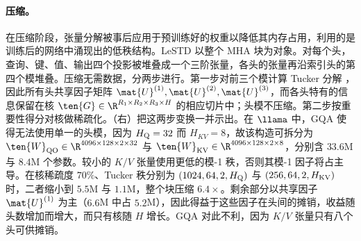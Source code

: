 \paragraph{压缩。}
在压缩阶段，张量分解被事后应用于预训练好的权重以降低其内存占用，利用的是训练后的网络中涌现出的低秩结构。LeSTD \cite{li2026lestd} 以整个 MHA 块为对象。对每个头，查询、键、值、输出四个投影被堆叠成一个三阶张量，各头的张量再沿索引头的第四个模堆叠。压缩无需数据，分两步进行。第一步对前三个模计算 Tucker 分解
，因此所有头共享因子矩阵 $\mat{U}^{(1)},\mat{U}^{(2)},\mat{U}^{(3)}$，而各头特有的信息保留在核 $\ten{G}\in\R^{R_1\times R_2\times R_3\times H}$ 的相应切片中；头模不压缩。第二步按重要性得分对核做稀疏化。（右）把这两步变换一并示出。在 $\llama$ 中，GQA 使得无法使用单一的头模，因为 $H_{\rm Q}=32$ 而 $H_{KV}=8$，故该构造可拆分为 $\ten{W}_{\rm QO}\in\R^{4096\times128\times2\times32}$ 与 $\ten{W}_{\rm KV}\in\R^{4096\times128\times2\times8}$，分别含 $33.6$M 与 $8.4$M 个参数。较小的 $K/V$ 张量使用更低的模-1 秩，否则其模-1 因子将占主导。在核稀疏度 $70\%$、Tucker 秩分别为 $(1024,64,2,H_{\rm Q})$ 与 $(256,64,2,H_{\rm KV})$ 时，二者缩小到 $5.5$M 与 $1.1$M，整个块压缩 $6.4\times$。剩余部分以共享因子 $\mat{U}^{(1)}$ 为主（$6.6$M 中占 $5.2$M），因此得益于这些因子在头间的摊销，收益随头数增加而增大，而只有核随 $H$ 增长。GQA 对此不利，因为 $K/V$ 张量只有八个头可供摊销。

